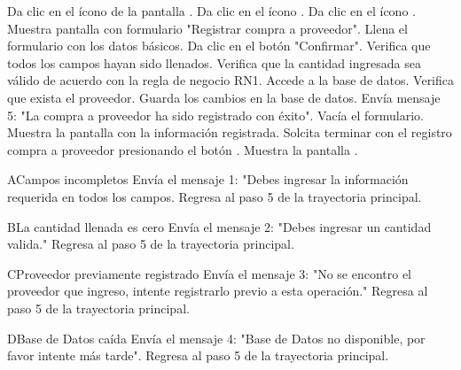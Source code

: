 \begin{UCtrayectoria}
	
	\UCpaso[\UCactor] Da clic en el ícono  de la pantalla .
	\UCpaso[\UCactor] Da clic en el ícono .
	\UCpaso[\UCactor] Da clic en el ícono .
	\UCpaso[\UCsist]  Muestra pantalla con formulario "Registrar compra a proveedor".
	\UCpaso[\UCactor] Llena el formulario con los datos básicos.
	\UCpaso[\UCactor] Da clic en el botón "Confirmar".
	\UCpaso[\UCsist] Verifica que todos los campos hayan sido llenados. 
	\UCpaso[\UCsist] Verifica que la cantidad ingresada sea válido de acuerdo con la regla de negocio RN1.
	\UCpaso[\UCsist] Accede a la base de datos. 
	\UCpaso[\UCsist] Verifica que exista el proveedor. 
	\UCpaso[\UCsist] Guarda los cambios en la base de datos.
	\UCpaso[\UCsist] Envía mensaje 5: "La compra a proveedor ha sido registrado con éxito".
	\UCpaso[\UCsist] Vacía el formulario.
	\UCpaso[\UCsist] Muestra la pantalla  con la información registrada.
	\UCpaso[\UCactor] Solcita terminar con el registro compra a proveedor presionando el botón .
	\UCpaso[\UCsist] Muestra la pantalla .
	
\end{UCtrayectoria}


\begin{UCtrayectoriaA}{A}{Campos incompletos}
	\UCpaso[\UCsist] Envía el mensaje 1: "Debes ingresar la información requerida en todos los campos.			
	\UCpaso[] Regresa al paso 5 de la trayectoria principal.
\end{UCtrayectoriaA}

\begin{UCtrayectoriaA}{B}{La cantidad llenada es cero}
	\UCpaso[\UCsist] Envía el mensaje 2: "Debes ingresar un cantidad valida."			
	\UCpaso[] Regresa al paso 5 de la trayectoria principal.
\end{UCtrayectoriaA}

\begin{UCtrayectoriaA}{C}{Proveedor previamente registrado}
	\UCpaso[\UCsist] Envía el mensaje 3: "No se encontro el proveedor que ingreso, intente registrarlo previo a esta operación."			
	\UCpaso[] Regresa al paso 5 de la trayectoria principal.
\end{UCtrayectoriaA}

\begin{UCtrayectoriaA}{D}{Base de Datos caída}
	\UCpaso[\UCsist] Envía el mensaje 4: "Base de Datos no disponible, por favor intente más tarde".			
	\UCpaso[] Regresa al paso 5 de la trayectoria principal.
\end{UCtrayectoriaA}